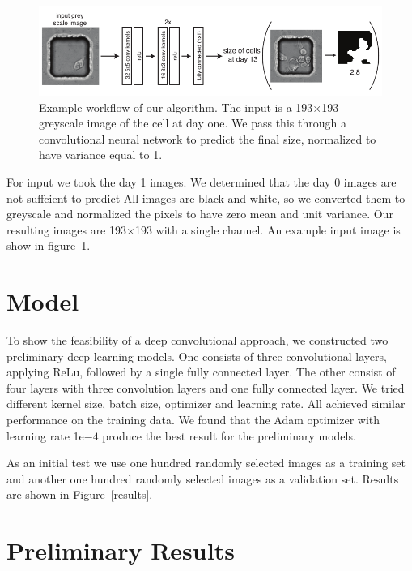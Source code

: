 \documentclass[10pt,twocolumn,letterpaper]{article}
\begin{document}
\begin{figure}[t!]
\begin{center}
 \includegraphics[width=0.8\linewidth]{figures/networkExampleImage.pdf}
\end{center}
   \caption{Example workflow of our algorithm.  The input is a 193$\times$193 greyscale image of the cell at day one.  We pass this through a convolutional neural network to predict the final size, normalized to have variance equal to 1.}
\label{workflow}
\end{figure}

For input we took the day 1 images.  We determined that the day 0 images are not suffcient to predict  All images are black and white, so we converted them to greyscale and normalized the pixels to have zero mean and unit variance.  Our resulting images are 193$\times$193 with a single channel.   An example input image is show in figure~\ref{workflow}.






\section{Model}




To show the feasibility of a deep convolutional approach, we constructed two preliminary deep learning models. One consists of three convolutional layers, applying ReLu, followed by a single fully connected layer. The other consist of four layers with three convolution layers and one fully connected layer. We tried different kernel size, batch size, optimizer and learning rate.  All achieved similar performance on the training data.  We found that the Adam optimizer with learning rate 1e$-4$ produce the best result for the preliminary models.

As an initial test we use one hundred randomly selected images as a training set and another one hundred randomly selected images as a validation set.  Results are shown in Figure~\ref{results}.





\section{Preliminary Results}
\end{document}
